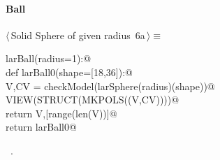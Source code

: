 \documentclass[11pt,oneside]{article}	%
\begin{document}
\paragraph{Ball}
\begin{flushleft} \small \label{scrap12}
\protect{}$\langle\,$Solid Sphere of given radius\nobreak\ {\footnotesize 6a}$\,\rangle\equiv$
\vspace{-1ex}
\begin{list}{}{} \item
\mbox{}\verb@def larBall(radius=1):@\\
\mbox{}\verb@   def larBall0(shape=[18,36]):@\\
\mbox{}\verb@      V,CV = checkModel(larSphere(radius)(shape))@\\
\mbox{}\verb@      VIEW(STRUCT(MKPOLS((V,CV))))@\\
\mbox{}\verb@      return V,[range(len(V))]@\\
\mbox{}\verb@   return larBall0@\\
\mbox{}\verb@@{\NWsep}
\end{list}
\vspace{-1ex}
\footnotesize\addtolength{\baselineskip}{-1ex}
\begin{list}{}{\setlength{\itemsep}{-\parsep}\setlength{\itemindent}{-\leftmargin}}
\item \NWtxtMacroRefIn\ .
\end{list}
\end{flushleft}
\end{document}
